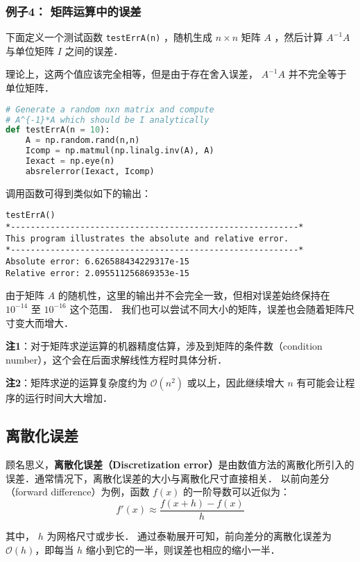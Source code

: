 \subsubsection{例子4： 矩阵运算中的误差}

下面定义一个测试函数 \verb|testErrA(n)| ，随机生成  $n\times n$  矩阵  $A$  ，然后计算  $A^{-1}A$  与单位矩阵  $I$  之间的误差．

理论上，这两个值应该完全相等，但是由于存在舍入误差， $A^{-1}A$ 并不完全等于单位矩阵．
\begin{lstlisting}[language=python]
# Generate a random nxn matrix and compute
# A^{-1}*A which should be I analytically
def testErrA(n = 10):
    A = np.random.rand(n,n)
    Icomp = np.matmul(np.linalg.inv(A), A)
    Iexact = np.eye(n)
    absrelerror(Iexact, Icomp)
\end{lstlisting}

调用函数可得到类似如下的输出：
\begin{lstlisting}[language={}]
testErrA()
*----------------------------------------------------------*
This program illustrates the absolute and relative error.
*----------------------------------------------------------*
Absolute error: 6.626588434229317e-15
Relative error: 2.095511256869353e-15
\end{lstlisting}

由于矩阵  $A$  的随机性，这里的输出并不会完全一致，但相对误差始终保持在 $10^{-14}$  至  $10^{-16}$  这个范围． 我们也可以尝试不同大小的矩阵，误差也会随着矩阵尺寸变大而增大．

\textbf{注1}：对于矩阵求逆运算的机器精度估算，涉及到矩阵的条件数（condition number），这个会在后面求解线性方程时具体分析．

\textbf{注2}：矩阵求逆的运算复杂度约为  $\mathcal{O}(n^2)$  或以上，因此继续增大  $n$  有可能会让程序的运行时间大大增加．

\subsection{离散化误差}

顾名思义，\textbf{离散化误差（Discretization error）}是由数值方法的离散化所引入的误差．通常情况下，离散化误差的大小与离散化尺寸直接相关． 以前向差分（forward difference）为例，函数  $f(x)$  的一阶导数可以近似为：
\begin{equation}
f'(x)\approx \frac{f(x+h)-f(x)}{h}
\end{equation}

其中，  $h$  为网格尺寸或步长． 通过泰勒展开可知，前向差分的离散化误差为 $\mathcal{O}(h)$，即每当 $h$ 缩小到它的一半，则误差也相应的缩小一半．

